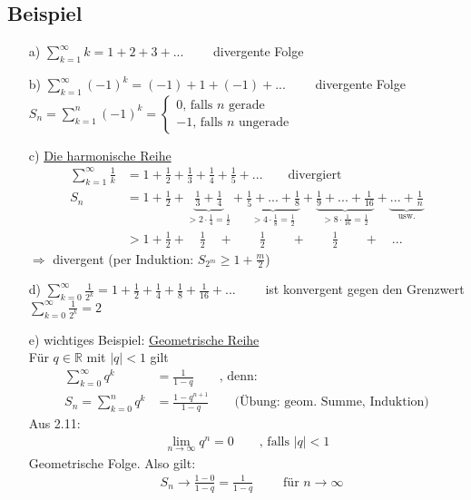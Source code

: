 \documentclass[12pt, titlepage]{article}
\newcommand{\R}{\mathds{R}}
\newcommand{\infn}{n\rightarrow\infty}
\renewcommand{\>}{\rightarrow}
\renewcommand{\*}{\cdot}
\begin{document}
	\subsection{Beispiel}
	\begin{itemize}
		\item[a)] $\sum_{k=1}^{\infty}k=1+2+3+...\qquad$ divergente Folge
		\item[b)] $\sum_{k=1}^{\infty}(-1)^k=(-1)+1+(-1)+...\qquad$ divergente Folge\\
		$S_n=\sum_{k=1}^{n}(-1)^k=\begin{cases}
		0\textrm{, falls }n\textrm{ gerade}\\
		-1\textrm{, falls }n\textrm{ ungerade}
		\end{cases}$
		\item[c)] \underline{Die harmonische Reihe}
		\begin{align*}
			\sum_{k=1}^{\infty}\frac{1}{k}&=1+\frac{1}{2}+\frac{1}{3}+\frac{1}{4}+\frac{1}{5}+...\qquad\textrm{divergiert}\\
			S_n&=1+\frac{1}{2}+\underbrace{\frac{1}{3}+\frac{1}{4}}_{>2\*\frac{1}{4}=\frac{1}{2}}+\underbrace{\frac{1}{5}+...+\frac{1}{8}}_{>4\*\frac{1}{8}=\frac{1}{2}}+\underbrace{\frac{1}{9}+...+\frac{1}{16}}_{>8\*\frac{1}{16}=\frac{1}{2}}+\underbrace{...+\frac{1}{n}}_{\textrm{usw.}}\\
			&>1+\frac{1}{2}+\quad\frac{1}{2}\quad+\qquad\frac{1}{2}\qquad+\qquad\frac{1}{2}\qquad+\quad...
		\end{align*}
		$\Rightarrow$ divergent (per Induktion: $S_{2^m}\geq1+\frac{m}{2}$)
		\item[d)] $\sum_{k=0}^{\infty}\frac{1}{2^k}=1+\frac{1}{2}+\frac{1}{4}+\frac{1}{8}+\frac{1}{16}+...\qquad$ ist konvergent gegen den Grenzwert $\sum_{k=0}^{\infty}\frac{1}{2^k}=2$
		\item[e)] wichtiges Beispiel: \underline{Geometrische Reihe}\\
		Für $q\in\R$ mit $|q|<1$ gilt
		\begin{align*}
			\sum_{k=0}^{\infty}q^k&=\frac{1}{1-q}\qquad\textrm{, denn:}\\
			S_n=\sum_{k=0}^{n}q^k&=\frac{1-q^{n+1}}{1-q}\qquad\textrm{(Übung: geom. Summe, Induktion)}
		\end{align*}
		Aus 2.11:
		\begin{align*}
			\lim\limits_{\infn}q^n=0\qquad\textrm{, falls }|q|<1
		\end{align*}
		Geometrische Folge. Also gilt:
		\begin{align*}
			&S_n\>\frac{1-0}{1-q}=\frac{1}{1-q}\qquad\textrm{ für }\infn\\

\end{align*}
\end{itemize}
\end{document}
